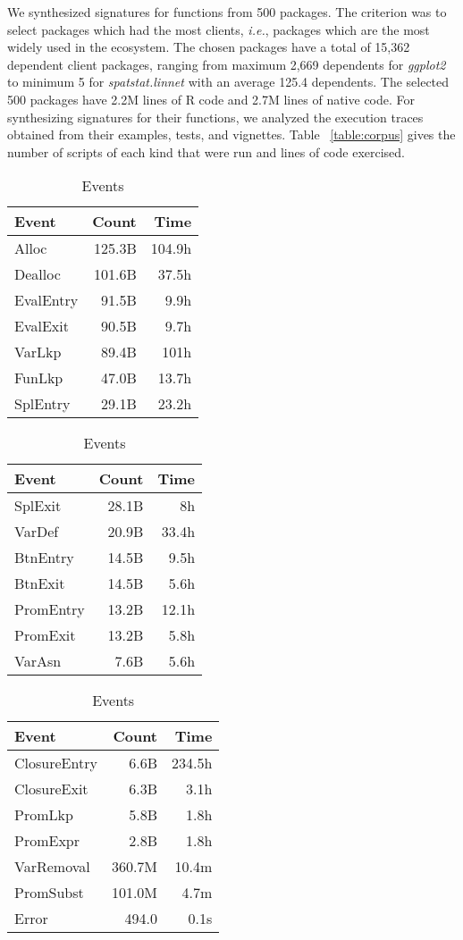 \documentclass[review,nonacm,screen,acmsmall,anonymous=true]{acmart}
\begin{document}
We synthesized signatures for functions from 500 packages. The criterion was to
select packages which had the most clients, \emph{i.e.}, packages which are the
most widely used in the ecosystem. The chosen packages have a total of 15,362 dependent client
packages, ranging from maximum 2,669 dependents for \emph{ggplot2} to minimum 5
for \emph{spatstat.linnet} with an average 125.4 dependents. The selected 500
packages have 2.2M lines of R code and 2.7M lines of native code. For
synthesizing signatures for their functions, we analyzed the execution traces
obtained from their examples, tests, and vignettes. Table ~\ref{table:corpus}
gives the number of scripts of each kind that were run and lines of code
exercised.

\begin{table}
  \vspace{-3mm}
  \small
  \caption{Events} \label{table:events}
  \centering
  \begin{tabular}{lrr}
    \toprule
    \bf Event&\bf Count& \bf Time\\
    \midrule
    Alloc&125.3B&104.9h\\
    Dealloc&101.6B&37.5h\\
    EvalEntry&91.5B&9.9h\\
    EvalExit&90.5B&9.7h\\
    VarLkp&89.4B&101h\\
    FunLkp&47.0B&13.7h\\
    SplEntry&29.1B&23.2h\\
    \bottomrule
  \end{tabular}
  \begin{tabular}{lrr}
    \toprule
    \bf Event&\bf Count& \bf Time\\
    \midrule
    SplExit&28.1B&8h\\
    VarDef&20.9B&33.4h\\
    BtnEntry&14.5B&9.5h\\
    BtnExit&14.5B&5.6h\\
    PromEntry&13.2B&12.1h\\
    PromExit&13.2B&5.8h\\
    VarAsn&7.6B&5.6h\\
    \bottomrule
  \end{tabular}
  \begin{tabular}{lrr}
    \toprule
    \bf Event&\bf Count& \bf Time\\
    \midrule
    ClosureEntry&6.6B&234.5h\\
    ClosureExit&6.3B&3.1h\\
    PromLkp&5.8B&1.8h\\
    PromExpr&2.8B&1.8h\\
    VarRemoval&360.7M&10.4m\\
    PromSubst&101.0M&4.7m\\
    Error&494.0&0.1s\\
    \bottomrule
  \end{tabular}
\end{table}
\end{document}
